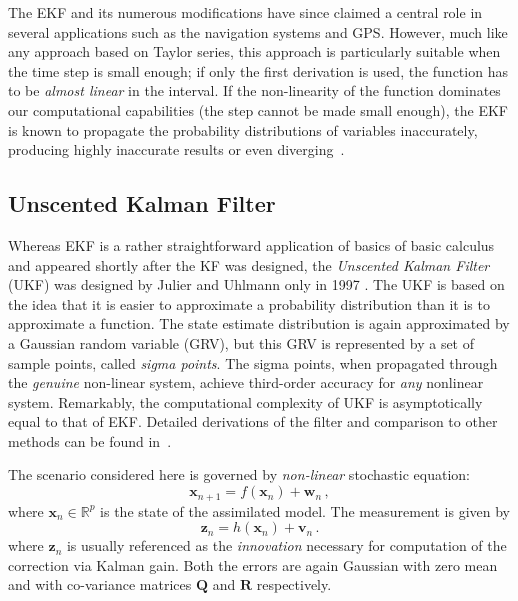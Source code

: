 The EKF and its numerous modifications have since claimed a central role in several applications such as the navigation systems and GPS. However, much like any approach based on Taylor series, this approach is particularly suitable when the time step is small enough; if only the first derivation is used, the function has to be \emph{almost linear} in the interval. If the non-linearity of the function dominates our computational capabilities (the step cannot be made small enough), the EKF is known to propagate the probability distributions of variables inaccurately, producing highly inaccurate results or even diverging~\cite{wan2000}.



\subsection{Unscented Kalman Filter}
\label{sm:UKF}
Whereas EKF is a rather straightforward application of basics of basic calculus and appeared shortly after the KF was designed, the \emph{Unscented Kalman Filter} (UKF) was designed by Julier and Uhlmann only in 1997 \cite{julier1997new}. The UKF is based on the idea that it is easier to approximate a probability distribution than it is to approximate a function.  The state estimate distribution is again approximated by a Gaussian random variable
(GRV), but this GRV is represented by a set of sample points, called \emph{sigma points}. The sigma points, when propagated through the \emph{genuine} non-linear system, achieve third-order accuracy \cite{wan2000} for \emph{any} nonlinear system. Remarkably, the computational complexity of UKF is asymptotically equal to that of EKF. Detailed derivations of the filter and comparison to other methods can be found in~\cite{julier2004unscented,wan2000}.

The scenario considered here is governed by \emph{non-linear} stochastic equation:
\begin{equation*}
\mathbf{x}_{n+1} = f(\mathbf{x}_{n}) + \mathbf{w}_{n}\,,
\end{equation*}
where $\mathbf{x}_n \in \mathbb{R}^p$ is the state of the assimilated model. The measurement is given by
\begin{equation*}
\mathbf{z}_n = h(\mathbf{x}_{n}) + \mathbf{v}_{n}\,.
\end{equation*}
where $\mathbf{z}_n$ is usually referenced as the \emph{innovation} necessary for computation of the correction via Kalman gain.
Both the errors are again Gaussian with zero mean and with co-variance matrices $\mathbf{Q}$ and $\mathbf{R}$ respectively. 


